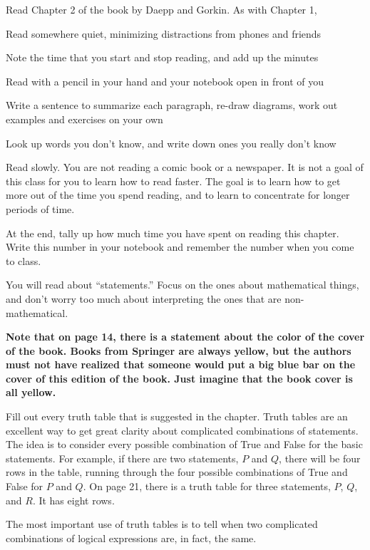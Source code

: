 
Read Chapter 2 of the book by Daepp and Gorkin.
As with Chapter 1,
\blist{0.0in}
\item Read somewhere quiet, minimizing distractions from phones and friends
\item Note the time that you start and stop reading, and add up the minutes
\item Read with a pencil in your hand and your notebook open in front of you
\item Write a sentence to summarize each paragraph, re-draw diagrams, work out examples and exercises on your own
\item Look up words you don't know, and write down ones you really don't know
\item Read slowly.  You are not reading a comic book or a newspaper.  It is not a goal of this class for you to learn how to read faster.  The goal is to learn how to get more out of the time you spend reading, and to learn to concentrate for longer periods of time.
\item At the end, tally up how much time you have spent on reading this chapter.
Write this number in your notebook and remember the number when you come to class.
\elist

You will read about ``statements.''
Focus on the ones about mathematical things, and don't worry too much about interpreting the ones that are non-mathematical.

{\bf Note that on page 14, there is a statement about the color of the cover of the book.  Books from Springer are always yellow, but the authors must not have realized that someone would put a big blue bar on the cover of this edition of the book.  Just imagine that the book cover is all yellow.}

Fill out every truth table that is suggested in the chapter.
Truth tables are an excellent way to get great clarity about complicated combinations of statements.
The idea is to consider every possible combination of True and False for the basic statements.
For example, if there are two statements, $P$ and $Q$, there will be four rows in the table, running through the four possible combinations of True and False for $P$ and $Q$.
On page 21, there is a truth table for three statements, $P$, $Q$, and $R$.
It has eight rows.

The most important use of truth tables is to tell when two complicated combinations of logical expressions are, in fact, the same.

